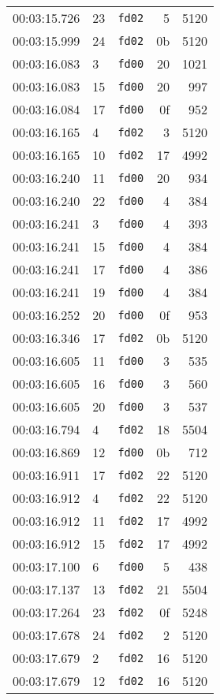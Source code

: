 \documentclass{article}
\begin{document}
\begin{longtable}{lllrr}
00:03:15.726 & 23 & \texttt{fd02} & 5 & 5120 \\
00:03:15.999 & 24 & \texttt{fd02} & 0b & 5120 \\
00:03:16.083 & 3 & \texttt{fd00} & 20 & 1021 \\
00:03:16.083 & 15 & \texttt{fd00} & 20 & 997 \\
00:03:16.084 & 17 & \texttt{fd00} & 0f & 952 \\
00:03:16.165 & 4 & \texttt{fd02} & 3 & 5120 \\
00:03:16.165 & 10 & \texttt{fd02} & 17 & 4992 \\
00:03:16.240 & 11 & \texttt{fd00} & 20 & 934 \\
00:03:16.240 & 22 & \texttt{fd00} & 4 & 384 \\
00:03:16.241 & 3 & \texttt{fd00} & 4 & 393 \\
00:03:16.241 & 15 & \texttt{fd00} & 4 & 384 \\
00:03:16.241 & 17 & \texttt{fd00} & 4 & 386 \\
00:03:16.241 & 19 & \texttt{fd00} & 4 & 384 \\
00:03:16.252 & 20 & \texttt{fd00} & 0f & 953 \\
00:03:16.346 & 17 & \texttt{fd02} & 0b & 5120 \\
00:03:16.605 & 11 & \texttt{fd00} & 3 & 535 \\
00:03:16.605 & 16 & \texttt{fd00} & 3 & 560 \\
00:03:16.605 & 20 & \texttt{fd00} & 3 & 537 \\
00:03:16.794 & 4 & \texttt{fd02} & 18 & 5504 \\
00:03:16.869 & 12 & \texttt{fd00} & 0b & 712 \\
00:03:16.911 & 17 & \texttt{fd02} & 22 & 5120 \\
00:03:16.912 & 4 & \texttt{fd02} & 22 & 5120 \\
00:03:16.912 & 11 & \texttt{fd02} & 17 & 4992 \\
00:03:16.912 & 15 & \texttt{fd02} & 17 & 4992 \\
00:03:17.100 & 6 & \texttt{fd00} & 5 & 438 \\
00:03:17.137 & 13 & \texttt{fd02} & 21 & 5504 \\
00:03:17.264 & 23 & \texttt{fd02} & 0f & 5248 \\
00:03:17.678 & 24 & \texttt{fd02} & 2 & 5120 \\
00:03:17.679 & 2 & \texttt{fd02} & 16 & 5120 \\
00:03:17.679 & 12 & \texttt{fd02} & 16 & 5120 \\

\end{longtable}
\end{document}
